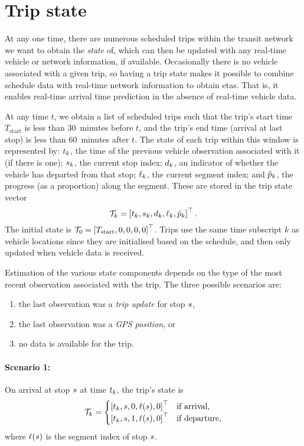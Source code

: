\section{Trip state}
\label{sec:trip_state}

At any one time, there are numerous scheduled trips within the transit network we want to obtain the \emph{state} of, which can then be updated with any real-time vehicle or network information, if available. Occasionally there is no vehicle associated with a given trip, so having a trip state makes it possible to combine schedule data with real-time network information to obtain \glspl{eta}. That is, it enables real-time arrival time prediction in the absence of real-time vehicle data.


At any time $t$, we obtain a list of scheduled trips such that the trip's start time $T_\text{start}$ is less than 30~minutes before $t$, and the trip's end time (arrival at last stop) is less than 60~minutes after $t$. The state of each trip within this window is represented by: $t_k$, the time of the previous vehicle observation associated with it (if there is one); $s_k$, the current stop index; $d_k$, an indicator of whether the vehicle has departed from that stop; $\ell_k$, the current segment index; and $\hat p_k$, the progress (as a proportion) along the segment. These are stored in the trip state vector
\begin{equation}
\label{eq:trip_state}
\mathcal{T}_k = \left[t_k, s_k, d_k, \ell_k, \hat p_k\right]^\top.
\end{equation}
The initial state is $\mathcal{T}_0 = \left[T_\text{start},0,0,0,0\right]^\top$. Trips use the same time subscript $k$ as vehicle locations since they are initialised based on the schedule, and then only updated when vehicle data is received.

Estimation of the various state components depends on the type of the most recent observation associated with the trip. The three possible scenarios are:
\begin{enumerate}
\item the last observation was a \emph{trip update} for stop $s$,
\item the last observation was a \emph{GPS position}, or
\item no data is available for the trip.
\end{enumerate}


\paragraph{Scenario 1:}
On arrival at stop $s$ at time $t_k$, the trip's state is
\begin{equation}
\label{eq:trip_state_tu}
\mathcal{T}_k =
\begin{cases}
\left[t_k, s, 0, \ell(s), 0\right]^\top & \text{if arrival}, \\
\left[t_k, s, 1, \ell(s), 0\right]^\top & \text{if departure},
\end{cases}
\end{equation}
where $\ell(s)$ is the segment index of stop $s$.


